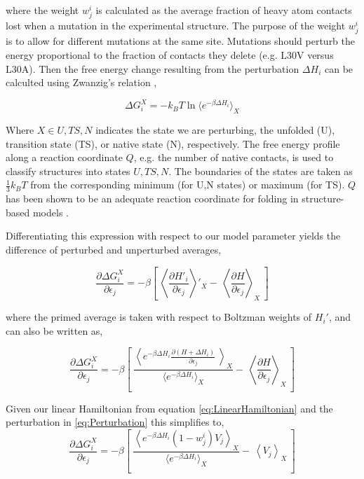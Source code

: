 \documentclass[preprint]{elsarticle}
\begin{document}
where the weight $w^i_j$ is calculated as the average fraction of heavy atom
contacts lost when a mutation in the experimental structure. The purpose of the
weight $w^i_j$ is to allow for different mutations at the same site. Mutations
should perturb the energy proportional to the fraction of contacts they delete
(e.g. L30V versus L30A). Then the free energy change resulting from the
perturbation $\Delta H_i$ can be calculted using Zwanzig's relation
\cite{Zwanzig1954},

\begin{equation}
    \Delta G^X_i = -k_BT \ln\langle e^{-\beta \Delta H_i}\rangle_X
\end{equation}

Where $X \in {U,TS,N}$ indicates the state we are perturbing, the unfolded (U),
transition state (TS), or native state (N), respectively. The free energy
profile along a reaction coordinate $Q$, e.g. the number of native contacts, is
used to classify structures into states ${U,TS,N}$. The boundaries of the
states are taken as $\frac{1}{3}k_BT$ from the corresponding minimum (for U,N
states) or maximum (for TS). $Q$ has been shown to be an adequate reaction
coordinate for folding in structure-based models \cite{Cho2006}.

    Differentiating this expression with respect to our model parameter yields
the difference of perturbed and unperturbed averages,

\begin{equation}
    \frac{\partial \Delta G^X_i}{\partial\epsilon_j} = -\beta\left[ \
    \left\langle \frac{\partial H'_i}{\partial\epsilon_j} \right\rangle'_X -\
    \left\langle \frac{\partial H}{\partial\epsilon_j} \right\rangle_X \
    \right]
\end{equation}

where the primed average is taken with respect to Boltzman weights of $H_i'$,
and can also be written as,



\begin{equation}
    \frac{\partial \Delta G^X_i}{\partial\epsilon_j} = -\beta\left[ \
    \frac{\left\langle e^{-\beta \Delta H_i}\frac{\partial (H + \Delta H_i)}{\partial\epsilon_j} \
    \right\rangle_X}{\langle e^{-\beta\Delta H_i} \rangle_X} -\
    \left\langle \frac{\partial H}{\partial\epsilon_j} \right\rangle_X \
    \right]
\end{equation}

Given our linear Hamiltonian from equation \ref{eq:LinearHamiltonian} and the
perturbation in \ref{eq:Perturbation} this simplifies to,
\begin{equation}
    \frac{\partial \Delta G^X_i}{\partial\epsilon_j} = -\beta\left[ \
    \frac{\left\langle e^{-\beta\Delta H_i} (1 - w^i_j) V_j  \right\rangle_X}{\langle e^{-\beta\Delta H_i} \rangle_X} -\
    \left\langle V_j \right\rangle_X \
    \right]
\end{equation}
\end{document}
